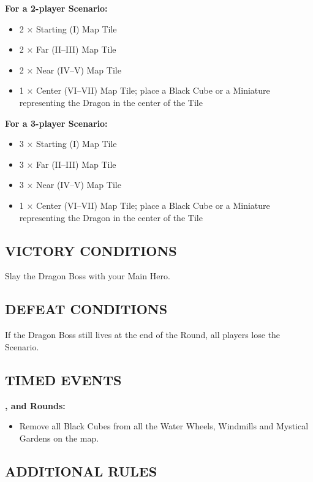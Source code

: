 \begin{multicols*}{2}
\columnbreak

\textbf{For a 2-player Scenario:}
\begin{itemize}
  \item 2 × Starting (I) Map Tile
  \item 2 × Far (II--III) Map Tile
  \item 2 × Near (IV--V) Map Tile
  \item 1 × Center (VI--VII) Map Tile; place a Black Cube or a Miniature representing the Dragon in the center of the Tile
\end{itemize}

\textbf{For a 3-player Scenario:}
\begin{itemize}
  \item 3 × Starting (I) Map Tile
  \item 3 × Far (II--III) Map Tile
  \item 3 × Near (IV--V) Map Tile
  \item 1 × Center (VI--VII) Map Tile; place a Black Cube or a Miniature representing the Dragon in the center of the Tile
\end{itemize}

\subsection*{\MakeUppercase{Victory Conditions}}
Slay the Dragon Boss with your Main Hero.

\subsection*{\MakeUppercase{Defeat Conditions}}
If the Dragon Boss still lives at the end of the  Round, all players lose the Scenario.

\subsection*{\MakeUppercase{Timed Events}}

\textbf{,  and  Rounds:}
\begin{itemize}
  \item Remove all Black Cubes from all the Water Wheels, Windmills and Mystical Gardens on the map.
\end{itemize}

\subsection*{\MakeUppercase{Additional Rules}}


\end{multicols*}
